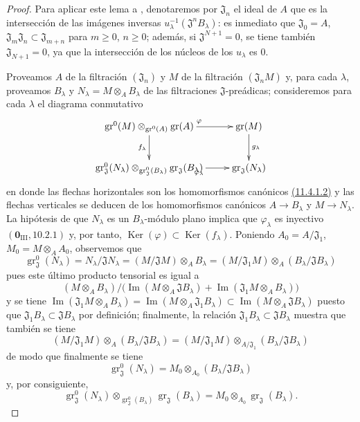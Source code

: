 \begin{proof}
Para aplicar este lema a , denotaremos por $\mathfrak J_n$ el ideal de $A$ que es la intersección
de las imágenes inversas $u_\lambda^{-1}(\mathfrak J^nB_\lambda)$: es inmediato que $\mathfrak J_0=A$, $\mathfrak J_m\mathfrak J_n\subset\mathfrak J_{m+n}$
para $m\geq0$, $n\geq0$; además, si $\mathfrak J^{N+1}=0$, se tiene también $\mathfrak J_{N+1}=0$, ya que la intersección de los
núcleos de los $u_\lambda$ es $0$.

Proveamos $A$ de la filtración $(\mathfrak J_n)$ y $M$ de la filtración $(\mathfrak J_nM)$ y, para cada $\lambda$,
proveamos $B_\lambda$ y $N_\lambda=M\otimes_A B_\lambda$ de las filtraciones $\mathfrak J$-preádicas; consideremos para cada $\lambda$ el
diagrama conmutativo
\[
\xymatrix{
\operatorname{gr}^0(M)\otimes_{\operatorname{gr}^0(A)}\operatorname{gr}(A)
 \ar[r]^{\varphi} \ar[d]_{f_\lambda} & \operatorname{gr}(M) \ar[d]^{g_\lambda} \\
\operatorname{gr}_{\mathfrak J}^0(N_\lambda)
 \otimes_{\operatorname{gr}_{\mathfrak J}^0(B_\lambda)}
 \operatorname{gr}_{\mathfrak J}(B_\lambda)
 \ar[r]_{\varphi_\lambda} & \operatorname{gr}_{\mathfrak J}(N_\lambda)
}
\]
en donde las flechas horizontales son los homomorfismos canónicos {\hyperlink{ega4.c04.lem.11-4-1-2}{(11.4.1.2)}} y las flechas
verticales se deducen de los homomorfismos canónicos $A\to B_\lambda$ y $M\to N_\lambda$. La hipótesis
de que $N_\lambda$ es un $B_\lambda$-módulo plano implica que $\varphi_\lambda$ es inyectivo $(\mathbf 0_{\mathrm{III}},10.2.1)$ y, por tanto,
$\operatorname{Ker}(\varphi)\subset\operatorname{Ker}(f_\lambda)$. Poniendo $A_0=A/\mathfrak J_1$, $M_0=M\otimes_A A_0$, observemos que
\[
\operatorname{gr}_{\mathfrak J}^0(N_\lambda)
=N_\lambda/\mathfrak JN_\lambda
=(M/\mathfrak JM)\otimes_A B_\lambda
=(M/\mathfrak J_1M)\otimes_A(B_\lambda/\mathfrak JB_\lambda)
\]
pues este último producto tensorial es igual a
\[
(M\otimes_A B_\lambda)\Big/
\big(\operatorname{Im}(M\otimes_A\mathfrak JB_\lambda)
 +\operatorname{Im}(\mathfrak J_1M\otimes_A B_\lambda)\big)
\]
y se tiene
$\operatorname{Im}(\mathfrak J_1M\otimes_A B_\lambda)
=\operatorname{Im}(M\otimes_A\mathfrak J_1B_\lambda)
\subset\operatorname{Im}(M\otimes_A\mathfrak JB_\lambda)$ puesto que
$\mathfrak J_1B_\lambda\subset\mathfrak JB_\lambda$ por definición; finalmente,
la relación $\mathfrak J_1B_\lambda\subset\mathfrak JB_\lambda$ muestra que también
se tiene
\[
(M/\mathfrak J_1M)\otimes_A(B_\lambda/\mathfrak JB_\lambda)
=(M/\mathfrak J_1M)\otimes_{A/\mathfrak J_1}
 (B_\lambda/\mathfrak JB_\lambda)
\]
de modo que finalmente se tiene
\[
\operatorname{gr}_{\mathfrak J}^0(N_\lambda)
=M_0\otimes_{A_0}(B_\lambda/\mathfrak JB_\lambda)
\]
y, por consiguiente,
\[
\operatorname{gr}_{\mathfrak J}^0(N_\lambda)
\otimes_{\operatorname{gr}_{\mathfrak J}^0(B_\lambda)}
\operatorname{gr}_{\mathfrak J}(B_\lambda)
=M_0\otimes_{A_0}\operatorname{gr}_{\mathfrak J}(B_\lambda).
\]


\end{proof}
